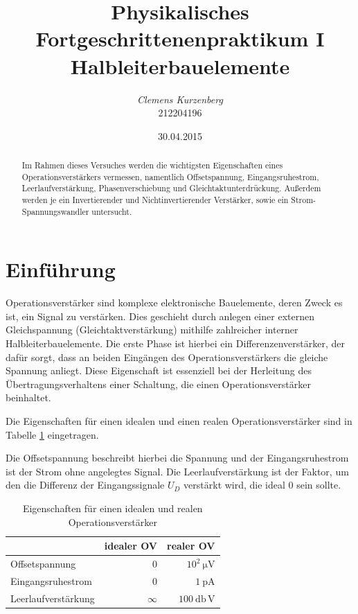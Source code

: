 \documentclass[10pt,a4paper]{scrartcl}
\title {Physikalisches Fortgeschrittenenpraktikum I\linebreak
Halbleiterbauelemente}
\author {\emph{Clemens Kurzenberg}\\212204196}
\date {30.04.2015}
\begin{document}
\maketitle

\begin{abstract}
    Im Rahmen dieses Versuches werden die wichtigsten Eigenschaften eines
    Operationsverstärkers vermessen,
    namentlich Offsetspannung, Eingangsruhestrom, Leerlaufverstärkung,
    Phasenverschiebung und Gleichtaktunterdrückung.
    Außerdem werden je ein Invertierender und Nichtinvertierender Verstärker,
    sowie ein Strom-Spannungswandler untersucht.
\end{abstract}

\tableofcontents

\pagebreak
\listoffigures
\listoftables

\pagebreak
\section {Einführung}


Operationsverstärker sind komplexe elektronische Bauelemente,
deren Zweck es ist, ein Signal zu verstärken.
Dies geschieht durch anlegen einer externen Gleichspannung
(Gleichtaktverstärkung)
mithilfe zahlreicher interner Halbleiterbauelemente.
Die erste Phase ist hierbei ein Differenzenverstärker,
der dafür sorgt,
dass an beiden Eingängen des Operationsverstärkers die gleiche Spannung anliegt.
Diese Eigenschaft ist essenziell bei der Herleitung des Übertragungsverhaltens
einer Schaltung,
die einen Operationsverstärker beinhaltet.

Die Eigenschaften für einen idealen und einen realen Operationsverstärker
sind in Tabelle \ref{tab:OV_prop} eingetragen.

Die Offsetspannung beschreibt hierbei die Spannung
und der Eingangsruhestrom ist der Strom ohne angelegtes Signal.
Die Leerlaufverstärkung ist der Faktor,
um den die Differenz der Eingangssignale $U_D$ verstärkt wird,
die ideal $0$ sein sollte.

\begin{table}[!ht]
    \centering
    \caption{Eigenschaften für einen idealen und realen Operationsverstärker}
    \label{tab:OV_prop}
    \begin{tabular}{l|r|r}
        &idealer OV&realer OV\\
        \hline
        Offsetspannung&$0$&$10^2~\mathrm{\mu V}$\\
        Eingangsruhestrom&$0$&$1~\mathrm{pA}$\\
        Leerlaufverstärkung&$\infty$&$100~\mathrm{db\,V}$
    \end{tabular}
\end{table}
\end{document}
